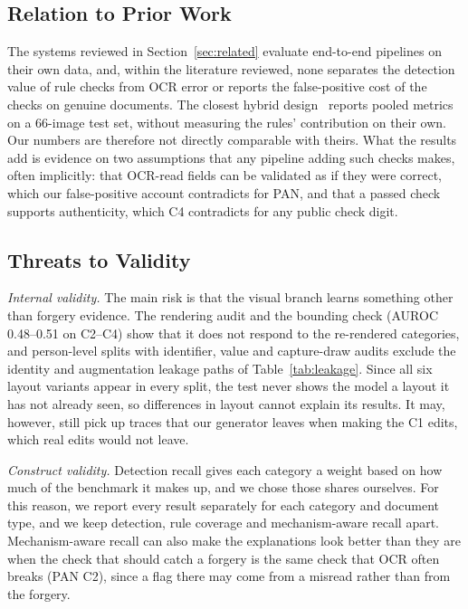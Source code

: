 \documentclass[12pt]{article}
\begin{document}
\subsection{Relation to Prior Work}
\label{subsec:priorwork}

The systems reviewed in Section~\ref{sec:related} evaluate end-to-end
pipelines on their own data, and, within the literature reviewed, none
separates the detection value of rule checks from OCR error or reports
the false-positive cost of the checks on genuine documents. The closest
hybrid design~\cite{limconnie} reports pooled metrics on a 66-image
test set, without measuring the rules' contribution on their own. Our
numbers are therefore not directly comparable with theirs. What the results add
is evidence on two assumptions that any pipeline adding such checks
makes, often implicitly: that OCR-read fields can be validated as if
they were correct, which our false-positive account contradicts for
PAN, and that a passed check supports authenticity, which C4
contradicts for any public check digit.

\subsection{Threats to Validity}
\label{sec:discussion-threats}

\emph{Internal validity.} The main risk is that the visual branch
learns something other than forgery evidence. The rendering audit and
the bounding check (AUROC 0.48--0.51 on C2--C4) show that it does not
respond to the re-rendered categories, and person-level splits with
identifier, value and capture-draw audits exclude the identity and
augmentation leakage paths of Table~\ref{tab:leakage}. Since all six layout variants appear in every split, the test never shows the model a layout it has not already seen, so differences in layout cannot explain its results. It may, however, still pick up traces that our generator leaves when making the C1 edits, which real edits would not leave.

\emph{Construct validity.} Detection recall gives each category a weight based on how much of the benchmark it makes up, and we chose those shares ourselves. For this reason, we report every result separately for each category and document type, and we keep detection, rule coverage and mechanism-aware recall apart. Mechanism-aware recall can also make the explanations look better than they are when the check that should catch a forgery is the same check that OCR often breaks (PAN C2), since a flag there may come from a misread rather than from the forgery.
\end{document}

